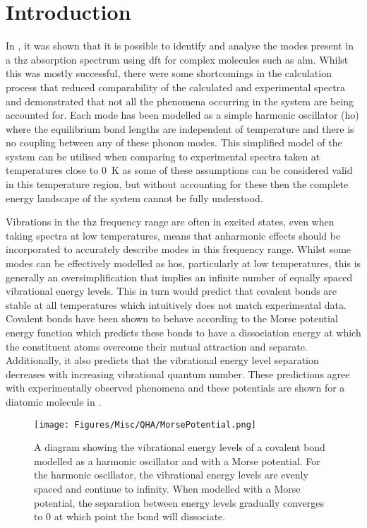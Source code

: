 \section{Introduction}
In , it was shown that it is possible to identify and analyse the modes present in a \acrshort{thz} absorption spectrum using \acrshort{dft} for complex molecules such as \acrshort{alm}. Whilst this was mostly successful, there were some shortcomings in the calculation process that reduced comparability of the calculated and experimental spectra and demonstrated that not all the phenomena occurring in the system are being accounted for. Each mode has been modelled as a simple harmonic oscillator (\acrshort{ho}) where the equilibrium bond lengths are independent of temperature and there is no coupling between any of these phonon modes. This simplified model of the system can be utilised when comparing to experimental spectra taken at temperatures close to \SI{0}{K} as some of these assumptions can be considered valid in this temperature region, but without accounting for these then the complete energy landscape of the system cannot be fully understood. 

Vibrations in the \acrshort{thz} frequency range are often in excited states, even when taking spectra at low temperatures, \DIFdelbegin {}\DIFdelend \DIFaddbegin {}\DIFaddend means that anharmonic effects should be incorporated to \DIFdelbegin {}\DIFdelend accurately describe modes in this frequency range. Whilst some modes can be effectively modelled as \acrshort{ho}s, particularly at low temperatures, this is generally an oversimplification that implies an infinite number of equally spaced vibrational energy levels. This in turn would predict that covalent bonds are stable at all temperatures which intuitively does not match experimental data. Covalent bonds have been shown to behave according to the Morse potential energy function which predicts these bonds to have a dissociation energy at which the constituent atoms overcome their mutual attraction and separate. Additionally, it also predicts that the vibrational energy level separation decreases with increasing vibrational quantum number. These predictions agree with experimentally observed phenomena and these potentials are shown for a diatomic molecule in . 

\begin{figure}[t]
    \centering
    \DIFdelbeginFL %
\DIFdelendFL \DIFaddbeginFL \texttt{[image: Figures/Misc/QHA/MorsePotential.png]}
    \DIFaddendFL \captionsetup{font = footnotesize, justification = centering}
    \caption[The Harmonic Oscillator and Morse Potential]{A diagram showing the vibrational energy levels of a covalent bond modelled as a harmonic oscillator and with a Morse potential. For the harmonic oscillator, the vibrational energy levels are evenly spaced and continue to infinity. When modelled with a Morse potential, the separation between energy levels gradually converges to 0 at which point the bond will dissociate.}
    \label{fig:SHO_morse}
\end{figure}

